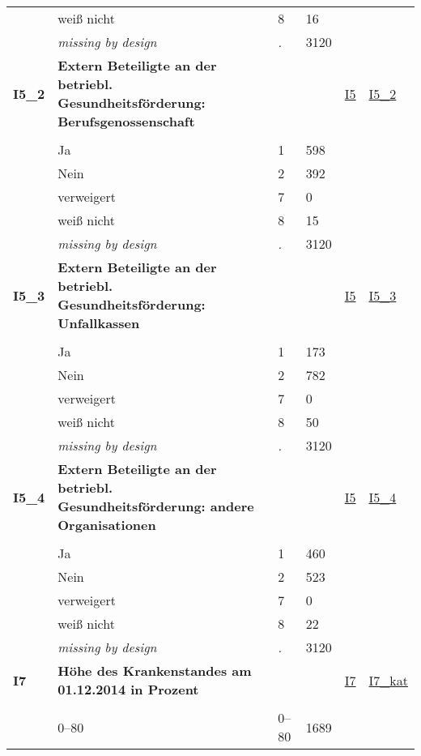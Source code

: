\begin{longtable}{| L{2.45cm} | L{6cm} | C{1.5cm} | R{1cm} | C{2.25cm} | C{2.25cm} |}
   & weiß nicht & 8 & 16 &  &  \\ 
   & \textit{missing by design} & \textit{.} & 3120 &  &  \\ 
   \midrule
\textbf{I5\_2}\label{var:I5:2} & \textbf{Extern Beteiligte an der betriebl. Gesundheitsförderung: Berufsgenossenschaft} &  &  & \hyperref[I5]{I5} & \hyperref[var:suf:I5:2]{I5\_2} \\ 
   &  &  &  &  &  \\ 
   & Ja & 1 & 598 &  &  \\ 
   & Nein & 2 & 392 &  &  \\ 
   & verweigert & 7 & 0 &  &  \\ 
   & weiß nicht & 8 & 15 &  &  \\ 
   & \textit{missing by design} & \textit{.} & 3120 &  &  \\ 
   \midrule
\textbf{I5\_3}\label{var:I5:3} & \textbf{Extern Beteiligte an der betriebl. Gesundheitsförderung: Unfallkassen} &  &  & \hyperref[I5]{I5} & \hyperref[var:suf:I5:3]{I5\_3} \\ 
   &  &  &  &  &  \\ 
   & Ja & 1 & 173 &  &  \\ 
   & Nein & 2 & 782 &  &  \\ 
   & verweigert & 7 & 0 &  &  \\ 
   & weiß nicht & 8 & 50 &  &  \\ 
   & \textit{missing by design} & \textit{.} & 3120 &  &  \\ 
   \midrule
\textbf{I5\_4}\label{var:I5:4} & \textbf{Extern Beteiligte an der betriebl. Gesundheitsförderung: andere Organisationen} &  &  & \hyperref[I5]{I5} & \hyperref[var:suf:I5:4]{I5\_4} \\ 
   &  &  &  &  &  \\ 
   & Ja & 1 & 460 &  &  \\ 
   & Nein & 2 & 523 &  &  \\ 
   & verweigert & 7 & 0 &  &  \\ 
   & weiß nicht & 8 & 22 &  &  \\ 
   & \textit{missing by design} & \textit{.} & 3120 &  &  \\ 
   \midrule
\textbf{I7}\label{var:I7} & \textbf{Höhe des Krankenstandes am 01.12.2014 in Prozent} &  &  & \hyperref[I7]{I7} & \hyperref[var:suf:I7:kat]{I7\_kat} \\ 
   &  &  &  &  &  \\ 
   & 0--80 & 0--80 & 1689 &  &  \\ 

\end{longtable}
